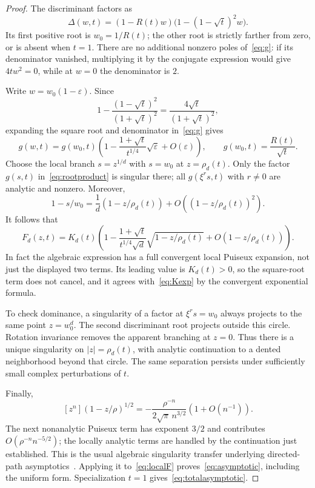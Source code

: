 \documentclass[11pt]{article}
\numberwithin{equation}{section}
\theoremstyle{definition}
\begin{document}
\begin{proof}
The discriminant factors as
\begin{equation}
 \Delta(w,t)=(1-R(t)w)\bigl(1-(1-\sqrt t)^2w\bigr).
 \label{eq:deltafact}
\end{equation}
Its first positive root is $w_0=1/R(t)$; the other root is strictly farther
from zero, or is absent when $t=1$. There are no additional nonzero poles
of~\eqref{eq:g}: if its denominator vanished, multiplying it by the
conjugate expression would give $4tw^2=0$, while at $w=0$ the denominator
is $2$.

Write $w=w_0(1-\varepsilon)$. Since
\[
 1-\frac{(1-\sqrt t)^2}{(1+\sqrt t)^2}
 =\frac{4\sqrt t}{(1+\sqrt t)^2},
\]
expanding the square root and denominator in~\eqref{eq:g} gives
\begin{equation}
 g(w,t)=g(w_0,t)
 \left(1-\frac{1+\sqrt t}{t^{1/4}}\sqrt{\varepsilon}
       +O(\varepsilon)\right),
 \qquad g(w_0,t)=\frac{R(t)}{\sqrt t}.
 \label{eq:baseexpansion}
\end{equation}
Choose the local branch $s=z^{1/d}$ with $s=w_0$ at $z=\rho_d(t)$.
Only the factor $g(s,t)$ in~\eqref{eq:rootproduct} is singular there;
all $g(\xi^rs,t)$ with $r\ne0$ are analytic and nonzero. Moreover,
\[
 1-s/w_0=\frac1d(1-z/\rho_d(t))+O((1-z/\rho_d(t))^2).
\]
It follows that
\begin{equation}
 F_d(z,t)=K_d(t)
 \left(1-\frac{1+\sqrt t}{t^{1/4}\sqrt d}
               \sqrt{1-z/\rho_d(t)}+O(1-z/\rho_d(t))\right).
 \label{eq:localF}
\end{equation}
In fact the algebraic expression has a full convergent local Puiseux
expansion, not just the displayed two terms. Its leading value is
$K_d(t)>0$, so the square-root term does not cancel, and it agrees
with~\eqref{eq:Kexp} by the convergent exponential formula.

To check dominance, a singularity of a factor at
$\xi^rs=w_0$ always projects to the same point $z=w_0^d$.
The second discriminant root projects outside this circle. Rotation
invariance removes the apparent branching at $z=0$.
Thus there is a unique singularity on $|z|=\rho_d(t)$, with analytic
continuation to a dented neighborhood beyond that circle. The same separation
persists under sufficiently small complex perturbations of $t$.

Finally,
\[
 [z^n](1-z/\rho)^{1/2}
 =-\frac{\rho^{-n}}{2\sqrt\pi\,n^{3/2}}
                         \left(1+O(n^{-1})\right).
\]
The next nonanalytic Puiseux term has exponent $3/2$ and contributes
$O(\rho^{-n}n^{-5/2})$; the locally analytic terms are handled by the
continuation just established. This is the usual algebraic singularity
transfer underlying directed-path asymptotics~\cite{BF,FO}.
Applying it to~\eqref{eq:localF} proves~\eqref{eq:asymptotic}, including the
uniform form. Specialization $t=1$ gives~\eqref{eq:totalasymptotic}.
\end{proof}
\end{document}

